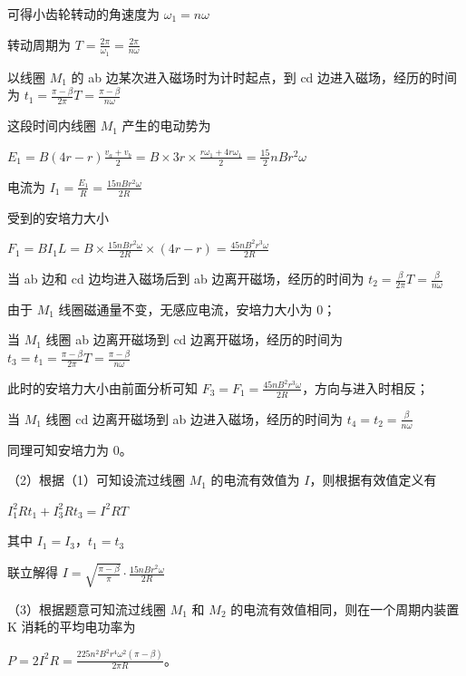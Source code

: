 \documentclass[\gkver]{gaokaozhenti}
\begin{document}
\begin{enumerate}
{可得小齿轮转动的角速度为 $\omega_{1} = n\omega$

转动周期为 $T = \frac{2\pi}{\omega_{1}} = \frac{2\pi}{n\omega}$

以线圈 $M_{1}$ 的 ab 边某次进入磁场时为计时起点，到 cd 边进入磁场，经历的时间为 $t_{1} = \frac{\pi - \beta}{2\pi}T = \frac{\pi - \beta}{n\omega}$

这段时间内线圈 $M_{1}$ 产生的电动势为

$E_{1} = B(4r - r)\frac{v_{a} + v_{b}}{2} = B \times 3r \times \frac{r\omega_{1} + 4r\omega_{1}}{2} = \frac{15}{2}nBr^{2}\omega$

电流为 $I_{1} = \frac{E_{1}}{R} = \frac{15nBr^{2}\omega}{2R}$

受到的安培力大小

$F_{1} = BI_{1}L = B \times \frac{15nBr^{2}\omega}{2R} \times (4r - r) = \frac{45nB^{2}r^{3}\omega}{2R}$

当 ab 边和 cd 边均进入磁场后到 ab 边离开磁场，经历的时间为 $t_{2} = \frac{\beta}{2\pi}T = \frac{\beta}{n\omega}$

由于 $M_{1}$ 线圈磁通量不变，无感应电流，安培力大小为 0；

当 $M_{1}$ 线圈 ab 边离开磁场到 cd 边离开磁场，经历的时间为 $t_{3} = t_{1} = \frac{\pi - \beta}{2\pi}T = \frac{\pi - \beta}{n\omega}$

此时的安培力大小由前面分析可知 $F_{3} = F_{1} = \frac{45nB^{2}r^{3}\omega}{2R}$，方向与进入时相反；

当 $M_{1}$ 线圈 cd 边离开磁场到 ab 边进入磁场，经历的时间为 $t_{4} = t_{2} = \frac{\beta}{n\omega}$

同理可知安培力为 0。

（2）根据（1）可知设流过线圈 $M_{1}$ 的电流有效值为 $I$，则根据有效值定义有

$I_{1}^{2}Rt_{1} + I_{3}^{2}Rt_{3} = I^{2}RT$

其中 $I_{1} = I_{3}$，$t_{1} = t_{3}$

联立解得 $I = \sqrt{\frac{\pi - \beta}{\pi}} \cdot \frac{15nBr^{2}\omega}{2R}$

（3）根据题意可知流过线圈 $M_{1}$ 和 $M_{2}$ 的电流有效值相同，则在一个周期内装置 K 消耗的平均电功率为

$P = 2I^{2}R = \frac{225n^{2}B^{2}r^{4}\omega^{2}(\pi - \beta)}{2\pi R}$。
}

\end{enumerate}
\end{document}
